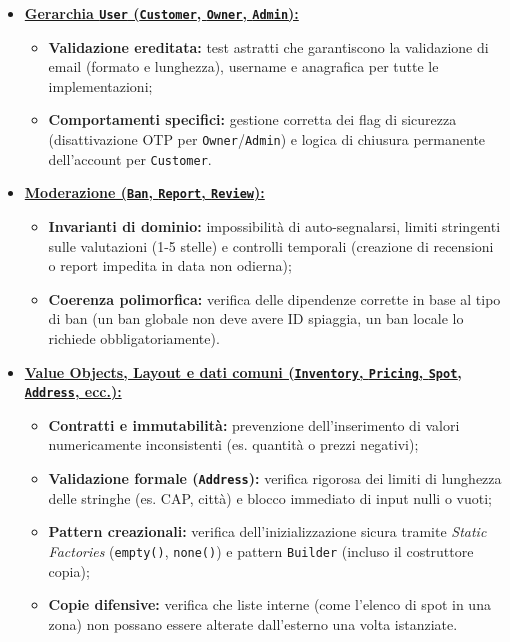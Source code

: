 \documentclass[a4paper,11pt]{article}
\begin{document}
\begin{itemize}[leftmargin=*]
	\item \underline{\textbf{Gerarchia \texttt{User} (\texttt{Customer}, \texttt{Owner}, \texttt{Admin}):}}
	\label{itm:domain_user}
	\begin{itemize}[nosep]
		\item \textbf{Validazione ereditata:} test astratti che garantiscono la validazione di email (formato e lunghezza), username e anagrafica per tutte le implementazioni;
		
		\item \textbf{Comportamenti specifici:} gestione corretta dei flag di sicurezza (disattivazione OTP per \texttt{Owner}/\texttt{Admin}) e logica di chiusura permanente dell'account per \texttt{Customer}.
	\end{itemize}
	
	\item \underline{\textbf{Moderazione (\texttt{Ban}, \texttt{Report}, \texttt{Review}):}}
	\label{itm:domain_moderation}
	\begin{itemize}[nosep]
		\item \textbf{Invarianti di dominio:} impossibilità di auto-segnalarsi, limiti stringenti sulle valutazioni (1-5 stelle) e controlli temporali (creazione di recensioni o report impedita in data non odierna);
		
		\item \textbf{Coerenza polimorfica:} verifica delle dipendenze corrette in base al tipo di ban (un ban globale non deve avere ID spiaggia, un ban locale lo richiede obbligatoriamente).
	\end{itemize}
	
	\item \underline{\textbf{Value Objects, Layout e dati comuni (\texttt{Inventory}, \texttt{Pricing}, \texttt{Spot}, \texttt{Address}, ecc.):}}
	\label{itm:domain_beachsubclasses}
	\begin{itemize}[nosep]
		\item \textbf{Contratti e immutabilità:} prevenzione dell'inserimento di valori numericamente inconsistenti (es. quantità o prezzi negativi);
		
		\item \textbf{Validazione formale (\texttt{Address}):} verifica rigorosa dei limiti di lunghezza delle stringhe (es. CAP, città) e blocco immediato di input nulli o vuoti;
		
		\item \textbf{Pattern creazionali:} verifica dell'inizializzazione sicura tramite \textit{Static Factories} (\texttt{empty()}, \texttt{none()}) e pattern \texttt{Builder} (incluso il costruttore copia);
		
		\item \textbf{Copie difensive:} verifica che liste interne (come l'elenco di spot in una zona) non possano essere alterate dall'esterno una volta istanziate.
	\end{itemize}
\end{itemize}
\end{document}
